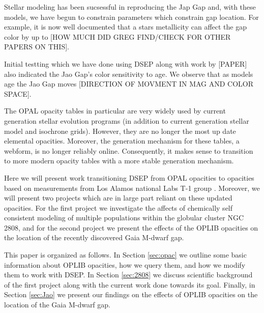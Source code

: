 Stellar modeling has been sucsessful in reproducing the Jap Gap and, with these
models, we have begun to constrain parameters which constrain gap location. For
example, it is now well documented that a stars metallicity can affect the gap
color by up to [HOW MUCH DID GREG FIND/CHECK FOR OTHER PAPERS ON THIS]. 

Initial testting which we have done using DSEP along with work by [PAPER] also
indicated the Jao Gap's color sensitivity to age. We observe that as models age
the Jao Gap moves [DIRECTION OF MOVMENT IN MAG AND COLOR SPACE].

The OPAL opacity tables in particular are very widely used by current
generation stellar evolution programs (in addition to current generation
stellar model and isochrone grids). However, they are no longer the most up
date elemental opacities. Moreover, the generation mechanism for these tables,
a webform, is no longer reliably online.  Consequently, it makes sense to
transition to more modern opacity tables with a more stable generation
mechanism.

Here we will present work transitioning DSEP from OPAL opacities to opacities
based on measurements from Los Alamos national Labs T-1 group
\citep[OPLIB][]{Colgan2016}. Moreover, we will present two projects which are
in large part reliant on these updated opacities. For the first project we
investigate the affects of chemically self consistent modeling of multiple
populations within the globular cluster NGC 2808, and for the second project we
present the effects of the OPLIB opacities on the location of the recently
discovered Gaia M-dwarf gap.

This paper is organized as follows. In Section \ref{sec:opac} we outline some
basic information about OPLIB opacities, how we query them, and how we modify
them to work with DSEP. In Section \ref{sec:2808} we discuss scientific
background of the first project along with the current work done towards its
goal. Finally, in Section \ref{sec:Jao} we present our findings on the effects
of OPLIB opacities on the location of the Gaia M-dwarf gap.





